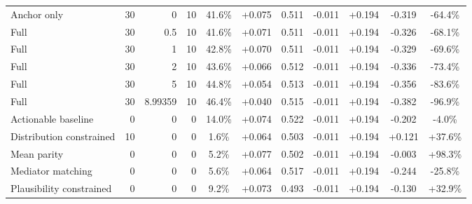 \begin{table}[htbp]
\begin{tabular}{lrrrccccccc}
Anchor only & 30 & 0 & 10 & 41.6\% & +0.075 & 0.511 & -0.011 & +0.194 & -0.319 & -64.4\% \\
Full & 30 & 0.5 & 10 & 41.6\% & +0.071 & 0.511 & -0.011 & +0.194 & -0.326 & -68.1\% \\
Full & 30 & 1 & 10 & 42.8\% & +0.070 & 0.511 & -0.011 & +0.194 & -0.329 & -69.6\% \\
Full & 30 & 2 & 10 & 43.6\% & +0.066 & 0.512 & -0.011 & +0.194 & -0.336 & -73.4\% \\
Full & 30 & 5 & 10 & 44.8\% & +0.054 & 0.513 & -0.011 & +0.194 & -0.356 & -83.6\% \\
Full & 30 & 8.99359 & 10 & 46.4\% & +0.040 & 0.515 & -0.011 & +0.194 & -0.382 & -96.9\% \\
Actionable baseline & 0 & 0 & 0 & 14.0\% & +0.074 & 0.522 & -0.011 & +0.194 & -0.202 & -4.0\% \\
Distribution constrained & 10 & 0 & 0 & 1.6\% & +0.064 & 0.503 & -0.011 & +0.194 & +0.121 & +37.6\% \\
Mean parity & 0 & 0 & 0 & 5.2\% & +0.077 & 0.502 & -0.011 & +0.194 & -0.003 & +98.3\% \\
Mediator matching & 0 & 0 & 0 & 5.6\% & +0.064 & 0.517 & -0.011 & +0.194 & -0.244 & -25.8\% \\
Plausibility constrained & 0 & 0 & 0 & 9.2\% & +0.073 & 0.493 & -0.011 & +0.194 & -0.130 & +32.9\% \\
\bottomrule
\end{tabular}
\end{table}